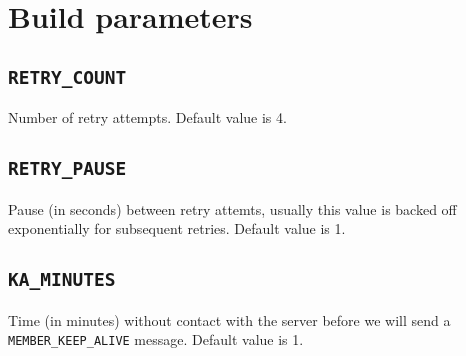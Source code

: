\documentclass[12pt]{article}
\newcommand{\mono}[1]{\texttt{#1}}
\begin{document}
\section{Build parameters}
\label{sec:build}
\subsection{\mono{RETRY\_COUNT}}
Number of retry attempts. Default value is 4.
\subsection{\mono{RETRY\_PAUSE}}
Pause (in seconds) between retry attemts, usually this value is backed off
exponentially for subsequent retries. Default value is 1.
\subsection{\mono{KA\_MINUTES}}
Time (in minutes) without contact with the server before we will send a
\mono{MEMBER\_KEEP\_ALIVE} message. Default value is 1.
\end{document}
